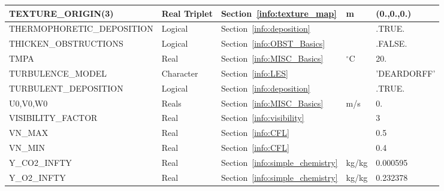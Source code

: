 \documentclass[11pt]{book}
\begin{document}
\begin{longtable}{@{\extracolsep{\fill}}|l|l|l|l|l|}
{\ct TEXTURE\_ORIGIN(3)}                        & Real Triplet  & Section~\ref{info:texture_map}                        & m             & (0.,0.,0.)        \\ \hline
{\ct THERMOPHORETIC\_DEPOSITION}                & Logical       & Section~\ref{info:deposition}                         &               & {\ct .TRUE.}    \\ \hline
{\ct THICKEN\_OBSTRUCTIONS}                     & Logical       & Section~\ref{info:OBST_Basics}                        &               & {\ct .FALSE.}     \\ \hline
{\ct TMPA}                                      & Real          & Section~\ref{info:MISC_Basics}                        & $^\circ$C     & 20.               \\ \hline
{\ct TURBULENCE\_MODEL}                         & Character     & Section~\ref{info:LES}                                &               & {\ct 'DEARDORFF'} \\ \hline
{\ct TURBULENT\_DEPOSITION}                     & Logical       & Section~\ref{info:deposition}                         &               & {\ct .TRUE.}    \\ \hline
{\ct U0,V0,W0}                                  & Reals         & Section~\ref{info:MISC_Basics}                        & m/s           & 0.                \\ \hline
{\ct VISIBILITY\_FACTOR}                        & Real          & Section~\ref{info:visibility}                         &               & 3                 \\ \hline
{\ct VN\_MAX}                                   & Real          & Section~\ref{info:CFL}                                &               & 0.5               \\ \hline
{\ct VN\_MIN}                                   & Real          & Section~\ref{info:CFL}                                &               & 0.4               \\ \hline
{\ct Y\_CO2\_INFTY}                             & Real          & Section~\ref{info:simple_chemistry}                   &  kg/kg            & 0.000595           \\ \hline
{\ct Y\_O2\_INFTY}                              & Real          & Section~\ref{info:simple_chemistry}                   &  kg/kg            & 0.232378          \\ \hline
\end{longtable}
\end{document}
